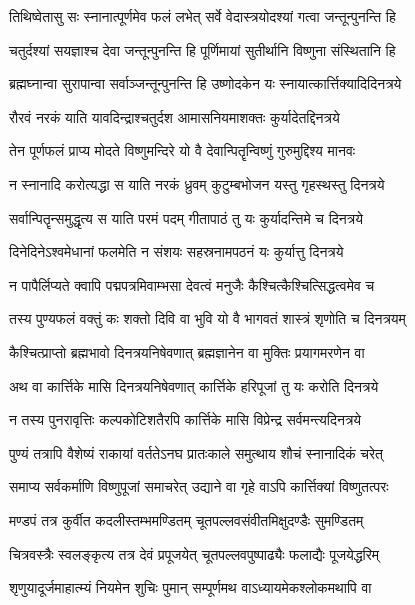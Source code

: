 \twolineshloka
{तिथिष्वेतासु सः स्नानात्पूर्णमेव फलं लभेत्}
{सर्वे वेदास्त्रयोदश्यां गत्वा जन्तून्पुनन्ति हि} %

\twolineshloka
{चतुर्दश्यां सयज्ञाश्च देवा जन्तून्पुनन्ति हि}
{पूर्णिमायां सुतीर्थानि विष्णुना संस्थितानि हि} %

\twolineshloka
{ब्रह्मघ्नान्वा सुरापान्वा सर्वाञ्जन्तून्पुनन्ति हि}
{उष्णोदकेन यः स्नायात्कार्त्तिक्यादिदिनत्रये} %

\twolineshloka
{रौरवं नरकं याति यावदिन्द्राश्चतुर्दश}
{आमासनियमाशक्तः कुर्यादेतद्दिनत्रये} %

\twolineshloka
{तेन पूर्णफलं प्राप्य मोदते विष्णुमन्दिरे}
{यो वै देवान्पितॄन्विष्णुं गुरुमुद्दिश्य मानवः} %

\twolineshloka
{न स्नानादि करोत्यद्धा स याति नरकं ध्रुवम्}
{कुटुम्बभोजन यस्तु गृहस्थस्तु दिनत्रये} %

\twolineshloka
{सर्वान्पितॄन्समुद्धृत्य स याति परमं पदम्}
{गीतापाठं तु यः कुर्यादन्तिमे च दिनत्रये} %

\twolineshloka
{दिनेदिनेऽश्वमेधानां फलमेति न संशयः}
{सहस्रनामपठनं यः कुर्यात्तु दिनत्रये} %

\twolineshloka
{न पापैर्लिप्यते क्वापि पद्मपत्रमिवाम्भसा}
{देवत्वं मनुजैः कैश्चित्कैश्चित्सिद्धत्वमेव च} %

\twolineshloka
{तस्य पुण्यफलं वक्तुं कः शक्तो दिवि वा भुवि}
{यो वै भागवतं शास्त्रं शृणोति च दिनत्रयम्} %

\twolineshloka
{कैश्चित्प्राप्तो ब्रह्मभावो दिनत्रयनिषेवणात्}
{ब्रह्मज्ञानेन वा मुक्तिः प्रयागमरणेन वा} %

\twolineshloka
{अथ वा कार्त्तिके मासि दिनत्रयनिषेवणात्}
{कार्त्तिके हरिपूजां तु यः करोति दिनत्रये} %

\twolineshloka
{न तस्य पुनरावृत्तिः कल्पकोटिशतैरपि}
{कार्त्तिके मासि विप्रेन्द्र सर्वमन्त्यदिनत्रये} %

\twolineshloka
{पुण्यं तत्रापि वैशेष्यं राकायां वर्ततेऽनघ}
{प्रातःकाले समुत्थाय शौचं स्नानादिकं चरेत्} %

\twolineshloka
{समाप्य सर्वकर्माणि विष्णुपूजां समाचरेत्}
{उद्याने वा गृहे वाऽपि कार्त्तिक्यां विष्णुतत्परः} %

\twolineshloka
{मण्डपं तत्र कुर्वीत कदलीस्तम्भमण्डितम्}
{चूतपल्लवसंवीतमिक्षुदण्डैः सुमण्डितम्} %

\twolineshloka
{चित्रवस्त्रैः स्वलङ्कृत्य तत्र देवं प्रपूजयेत्}
{चूतपल्लवपुष्पाढ्यैः फलाद्यैः पूजयेद्धरिम्} %

\twolineshloka
{शृणुयादूर्जमाहात्म्यं नियमेन शुचिः पुमान्}
{सम्पूर्णमथ वाऽध्यायमेकश्लोकमथापि वा} %


